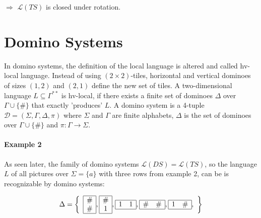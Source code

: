 \documentclass{article}
\begin{document}
$\Rightarrow$ $\mathcal{L}(TS)$ is closed under rotation.












\section{Domino Systems}
In domino systems, the definition of the local language is altered and called hv-local language. Instead of using $(2\times2)$-tiles, horizontal and vertical dominoes of sizes $(1,2)$ and $(2,1)$ define the new set of tiles. A two-dimensional language $L \subseteq \Gamma^{**}$ is hv-local, if there exists a finite set of dominoes $\Delta$ over $\Gamma \cup \{\#\}$ that exactly 'produces' $L$. 
A domino system is a 4-tuple $\mathcal{D}=(\Sigma, \Gamma, \Delta, \pi)$ where $\Sigma$ and $\Gamma$ are finite alphabets, $\Delta$ is the set of dominoes over $\Gamma \cup \{\#\}$ and $\pi: \Gamma \rightarrow \Sigma$. 

\paragraph{Example 2} As seen later, the family of domino systems $\mathcal{L}(DS) = \mathcal{L}(TS)$, so the language $L$ of all pictures over $\Sigma = \{a\}$ with three rows from example 2, can be is recognizable by domino systems:

$$\Delta = \left\{ 
\begin{array}{c}
 \begin{array}{|c|}
  \hline
  \#\\
  \#\\
  \hline
 \end{array},
\begin{array}{|c|}
  \hline
  \#\\
  1\\
  \hline
 \end{array},
 \begin{array}{|cc|}
  \hline
  1 & 1\\
  \hline
 \end{array},
 \begin{array}{|cc|}
  \hline
  \# & \#\\
  \hline
 \end{array},
 \begin{array}{|cc|}
  \hline
  1 & \#\\
  \hline
 \end{array},
\end{array}
\right\}$$
\end{document}
